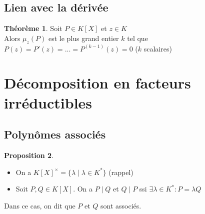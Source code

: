 \documentclass[10pt,a4paper]{article}
\theoremstyle{definition}
\newtheorem{proposition}{Proposition}[section]
\newtheorem{theorem}[proposition]{Théorème}
\begin{document}
\subsection{Lien avec la dérivée}
\begin{theorem}
Soit $P \in K[X]$ et $z \in K$ \\
Alors $\mu_z(P)$ est le plus grand entier $k$ tel que $P(z) = P'(z) = ... = P^{(k - 1)}(z) = 0$ \quad ($k$ scalaires)
\end{theorem}

\section{Décomposition en facteurs irréductibles}
\subsection{Polynômes associés}
\begin{proposition}
\hfill
\begin{itemize}
\item On a $K[X]^\times = \{ \lambda \mid \lambda \in K^* \}$ \quad (rappel)
\item Soit $P, Q \in K[X]$. On a $P \mid	Q$ et $Q \mid P$ ssi $\exists \lambda \in K^*: P = \lambda Q$
\end{itemize}
Dans ce cas, on dit que $P$ et $Q$ sont associés.
\end{proposition}
\end{document}

